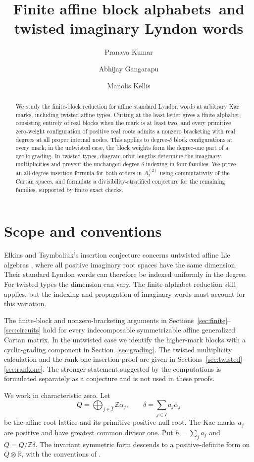 \documentclass[11pt]{amsart}
\title[Affine blocks and twisted imaginary words]{Finite affine block alphabets\ and twisted imaginary Lyndon words}
\author{Pranava Kumar}
\author{Abhijay Gangarapu}
\author{Manolis Kellis}
\date{}
\numberwithin{equation}{section}
\theoremstyle{definition}
\newcommand{\R}{\mathbb R}
\newcommand{\Z}{\mathbb Z}
\begin{document}
\begin{abstract}
We study the finite-block reduction for affine standard Lyndon words at arbitrary Kac marks, including twisted affine types. Cutting at the least letter gives a finite alphabet, consisting entirely of real blocks when the mark is at least two, and every primitive zero-weight configuration of positive real roots admits a nonzero bracketing with real degrees at all proper internal nodes. This applies to degree-$\delta$ block configurations at every mark; in the untwisted case, the block weights form the degree-one part of a cyclic grading. In twisted types, diagram-orbit lengths determine the imaginary multiplicities and prevent the unchanged degree-$\delta$ indexing in four families. We prove an all-degree insertion formula for both orders in $A_2^{(2)}$ using commutativity of the Cartan spaces, and formulate a divisibility-stratified conjecture for the remaining families, supported by finite exact checks.
\end{abstract}
\maketitle

\section{Scope and conventions}

Elkins and Tsymbaliuk's insertion conjecture concerns untwisted affine Lie algebras \cite[Conjecture~6.26]{ET}, where all positive imaginary root spaces have the same dimension. Their standard Lyndon words can therefore be indexed uniformly in the degree. For twisted types the dimension can vary. The finite-alphabet reduction still applies, but the indexing and propagation of imaginary words must account for this variation.

The finite-block and nonzero-bracketing arguments in Sections~\ref{sec:finite}--\ref{sec:circuits} hold for every indecomposable symmetrizable affine generalized Cartan matrix. In the untwisted case we identify the higher-mark blocks with a cyclic-grading component in Section~\ref{sec:grading}. The twisted multiplicity calculation and the rank-one insertion proof are given in Sections~\ref{sec:twisted}--\ref{sec:rankone}. The stronger statement suggested by the computations is formulated separately as a conjecture and is not used in these proofs.

We work in characteristic zero. Let
\[
 Q=\bigoplus_{j\in\widehat I}\Z\alpha_j,
 \qquad \delta=\sum_{j\in\widehat I}a_j\alpha_j
\]
be the affine root lattice and its primitive positive null root. The Kac marks $a_j$ are positive and have greatest common divisor one. Put $h=\sum_j a_j$ and $\overline Q=Q/\Z\delta$. The invariant symmetric form descends to a positive-definite form on $\overline Q\otimes\R$, with the conventions of \cite[Chapters~5--8]{Kac}.
\end{document}
